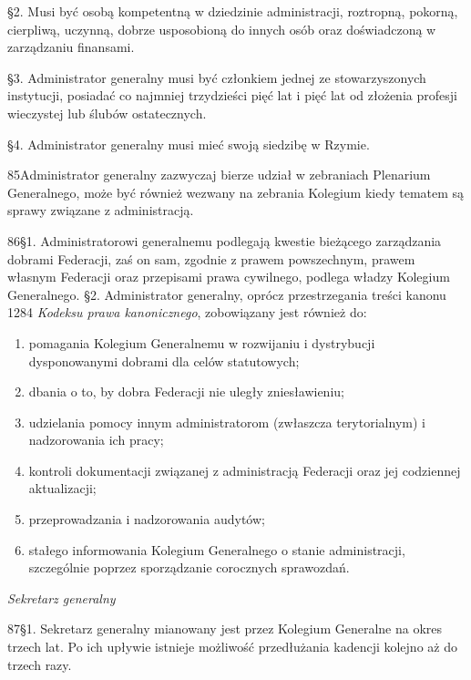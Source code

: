 ﻿\documentclass{book}
\newcommand{\lett}[1]{\lettrine[findent=6pt]{#1}}
\newcommand{\ssec}[1]{\vspace{1em}\textit{#1}\vspace{.5em}\nopagebreak}
\begin{document}
\S{}2. Musi być osobą kompetentną w dziedzinie administracji, roztropną, pokorną, cierpliwą, uczynną, dobrze usposobioną do innych osób oraz doświadczoną w zarządzaniu finansami.


\S{}3. Administrator generalny musi być członkiem jednej ze stowarzyszonych instytucji, posiadać co najmniej trzydzieści pięć lat i pięć lat od złożenia profesji wieczystej lub ślubów ostatecznych.


\S{}4. Administrator generalny musi mieć swoją siedzibę w Rzymie.
 
\lett{85} Administrator generalny zazwyczaj bierze udział w zebraniach Plenarium Generalnego, może być również wezwany na zebrania Kolegium kiedy tematem są sprawy związane z administracją.
 
\lett{86} \S{}1. Administratorowi generalnemu podlegają kwestie bieżącego zarządzania dobrami Federacji, zaś on sam, zgodnie z prawem powszechnym, prawem własnym Federacji oraz przepisami prawa cywilnego, podlega władzy Kolegium Generalnego.
\S{}2. Administrator generalny, oprócz przestrzegania treści kanonu 1284 {\em Kodeksu prawa kanonicznego}, zobowiązany jest również do:


\begin{enumerate}


\item pomagania Kolegium Generalnemu w rozwijaniu i dystrybucji dysponowanymi dobrami dla celów statutowych;


\item dbania o to, by dobra Federacji nie uległy zniesławieniu;


\item udzielania pomocy innym administratorom (zwłaszcza terytorialnym) i nadzorowania ich pracy;


\item kontroli dokumentacji związanej z administracją Federacji oraz jej codziennej aktualizacji;


\item przeprowadzania i nadzorowania audytów;


\item stałego informowania Kolegium Generalnego o stanie administracji, szczególnie poprzez sporządzanie corocznych sprawozdań.


\end{enumerate}
 
\ssec{Sekretarz generalny}


\lett{87} \S{}1. Sekretarz generalny mianowany jest przez Kolegium Generalne na okres trzech lat. Po ich upływie istnieje możliwość przedłużania kadencji kolejno aż do trzech razy.
\end{document}
